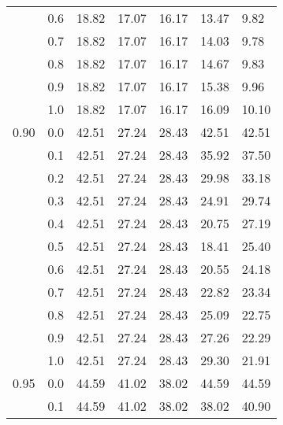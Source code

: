 \begin{longtable}{lp{2cm}|p{2cm}p{2cm}p{2cm}p{2cm}p{2cm}}
     & 0.6 &       18.82 &             17.07 &                16.17 &                13.47 &            9.82 \\
     & 0.7 &       18.82 &             17.07 &                16.17 &                14.03 &            9.78 \\
     & 0.8 &       18.82 &             17.07 &                16.17 &                14.67 &            9.83 \\
     & 0.9 &       18.82 &             17.07 &                16.17 &                15.38 &            9.96 \\
     & 1.0 &       18.82 &             17.07 &                16.17 &                16.09 &           10.10 \\
0.90 & 0.0 &       42.51 &             27.24 &                28.43 &                42.51 &           42.51 \\
     & 0.1 &       42.51 &             27.24 &                28.43 &                35.92 &           37.50 \\
     & 0.2 &       42.51 &             27.24 &                28.43 &                29.98 &           33.18 \\
     & 0.3 &       42.51 &             27.24 &                28.43 &                24.91 &           29.74 \\
     & 0.4 &       42.51 &             27.24 &                28.43 &                20.75 &           27.19 \\
     & 0.5 &       42.51 &             27.24 &                28.43 &                18.41 &           25.40 \\
     & 0.6 &       42.51 &             27.24 &                28.43 &                20.55 &           24.18 \\
     & 0.7 &       42.51 &             27.24 &                28.43 &                22.82 &           23.34 \\
     & 0.8 &       42.51 &             27.24 &                28.43 &                25.09 &           22.75 \\
     & 0.9 &       42.51 &             27.24 &                28.43 &                27.26 &           22.29 \\
     & 1.0 &       42.51 &             27.24 &                28.43 &                29.30 &           21.91 \\
0.95 & 0.0 &       44.59 &             41.02 &                38.02 &                44.59 &           44.59 \\
     & 0.1 &       44.59 &             41.02 &                38.02 &                38.02 &           40.90 \\

\end{longtable}
